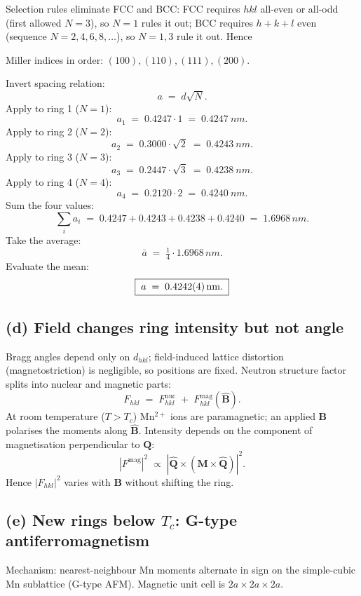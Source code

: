 \documentclass[11pt]{article}
\begin{document}
Selection rules eliminate FCC and BCC: FCC requires $hkl$ all-even or all-odd (first allowed $N=3$), so $N=1$ rules it out; BCC requires $h+k+l$ even (sequence $N=2,4,6,8,\ldots$), so $N=1,3$ rule it out. Hence

Miller indices in order: $(100),(110),(111),(200)$.

Invert spacing relation:
\[
a \;=\; d\sqrt{N}.
\]
Apply to ring 1 ($N=1$):
\[
a_1 \;=\; 0.4247\cdot 1 \;=\; \SI{0.4247}{nm}.
\]
Apply to ring 2 ($N=2$):
\[
a_2 \;=\; 0.3000\cdot \sqrt{2} \;=\; \SI{0.4243}{nm}.
\]
Apply to ring 3 ($N=3$):
\[
a_3 \;=\; 0.2447\cdot \sqrt{3} \;=\; \SI{0.4238}{nm}.
\]
Apply to ring 4 ($N=4$):
\[
a_4 \;=\; 0.2120\cdot 2 \;=\; \SI{0.4240}{nm}.
\]
Sum the four values:
\[
\sum_i a_i \;=\; 0.4247+0.4243+0.4238+0.4240 \;=\; 1.6968\,\si{nm}.
\]
Take the average:
\[
\bar a \;=\; \tfrac14\cdot 1.6968\,\si{nm}.
\]
Evaluate the mean:
\begin{equation}
\boxed{\;a \;=\; \SI{0.4242 \pm 0.0004}{nm}.\;}
\label{eq:abox}
\end{equation}

\subsection*{(d) Field changes ring intensity but not angle}

Bragg angles depend only on $d_{hkl}$; field-induced lattice distortion (magnetostriction) is negligible, so positions are fixed. Neutron structure factor splits into nuclear and magnetic parts:
\[
F_{hkl} \;=\; F^{\text{nuc}}_{hkl} \;+\; F^{\text{mag}}_{hkl}(\hat{\bm B}).
\]
At room temperature ($T>T_c$) Mn$^{2+}$ ions are paramagnetic; an applied $\bm B$ polarises the moments along $\hat{\bm B}$. Intensity depends on the component of magnetisation perpendicular to $\bm Q$:
\[
|F^{\text{mag}}|^2 \;\propto\; |\hat{\bm Q}\!\times\!(\bm M\!\times\!\hat{\bm Q})|^2.
\]
Hence $|F_{hkl}|^2$ varies with $\bm B$ without shifting the ring.

\subsection*{(e) New rings below $T_c$: G-type antiferromagnetism}

Mechanism: nearest-neighbour Mn moments alternate in sign on the simple-cubic Mn sublattice (G-type AFM). Magnetic unit cell is $2a\times 2a\times 2a$.
\end{document}
